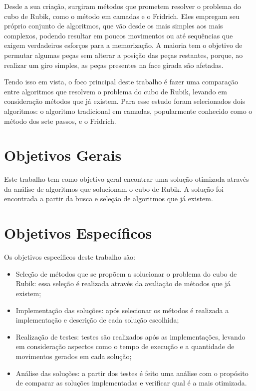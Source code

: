 Desde a sua criação, surgiram métodos que prometem resolver o problema do cubo de Rubik, como o método em camadas e o Fridrich. Eles empregam seu próprio conjunto de algoritmos, que vão desde os mais simples aos mais complexos, podendo resultar em poucos movimentos ou até sequências que exigem verdadeiros esforços para a memorização. A maioria tem o objetivo de permutar algumas peças sem alterar a posição das peças restantes, porque, ao realizar um giro simples, as peças presentes na face girada são afetadas.


Tendo isso em vista, o foco principal deste trabalho é fazer uma comparação entre algoritmos que resolvem o problema do cubo de Rubik, levando em consideração métodos que já existem. Para esse estudo foram selecionados dois algoritmos: o algoritmo tradicional em camadas, popularmente conhecido como o método dos sete passos, e o Fridrich.



\section{Objetivos Gerais}

Este trabalho tem como objetivo geral encontrar uma solução otimizada através da análise de algoritmos que solucionam o cubo de Rubik. A solução foi encontrada a partir da busca e seleção de algoritmos que já existem. 


\section{Objetivos Específicos} 

Os objetivos específicos deste trabalho são:

\begin{itemize}
    \item Seleção de métodos que se propõem a solucionar o problema do cubo de Rubik: essa seleção é realizada através da avaliação de métodos que já existem;
    
    \item Implementação das soluções: após selecionar os métodos é realizada a implementação e descrição de cada solução escolhida;
    
    \item Realização de testes: testes são realizados após as implementações, levando em consideração aspectos como o tempo de execução e a quantidade de movimentos gerados em cada solução;

    \item Análise das soluções: a partir dos testes é feito uma análise com o propósito de comparar as soluções implementadas e verificar qual é a mais otimizada.

    
\end{itemize}





